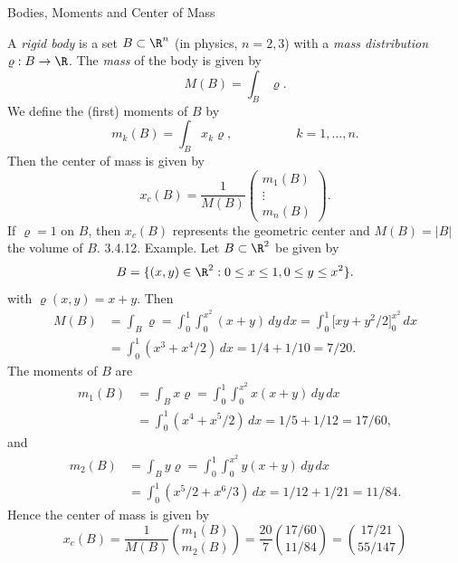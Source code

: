 \documentclass[smaller,hyperref={CJKbookmarks=true}]{beamer}
\begin{document}
\begin{frame}{Bodies, Moments and Center of Mass}
\begin{spacing}{0.75}
A \emph{rigid body} is a set $B\subset\R^n$ (in physics, $n=2,3$) with a \emph{mass distribution} $\varrho:B\to\R$. The \emph{mass} of the body is given by
\[M(B)=\int_B\varrho.\]
We define the (first) moments of $B$ by
\[m_k(B)=\int_B x_k\varrho,\qquad\qquad\quad
k=1,\ldots,n.\]
Then the center of mass is given by
\[x_c(B)=\frac{1}{M(B)}\begin{pmatrix}
                         m_1(B) \\
                         \vdots \\
                         m_n(B)
                       \end{pmatrix}.\]
If $\varrho=1$ on $B$, then $x_c(B)$ represents the geometric center and $M(B)=|B|$ the volume of $B$.
\newpage
\alert{3.4.12. Example.} Let $B\subset\R^2$ be given by
\[B=\{(x,y)\in\R^2:0\leq x\leq1,0\leq y\leq x^2\}.\]
with $\varrho(x,y)=x+y$. Then
\begin{equation*}
  \begin{split}
     M(B) &=\int_B\varrho=\int_{0}^{1}
     \int_{0}^{x^2}(x+y)\,dy\,dx=\int_{0}^{1}
     \big[xy+y^2/2\big]_0^{x^2}\,dx \\
       &=\int_{0}^{1}(x^3+x^4/2)\,dx=1/4+1/10=7/20.
  \end{split}
\end{equation*}
The moments of $B$ are
\begin{equation*}
  \begin{split}
     m_1(B) &=\int_Bx\varrho=\int_{0}^{1}\int_{0}^{x^2}x(x+y)\,dy\,dx \\
       &=\int_{0}^{1}(x^4+x^5/2)\,dx=1/5+1/12=17/60,
  \end{split}
\end{equation*}
\newpage
\vspace*{15pt}
and
\begin{equation*}
  \begin{split}
     m_2(B) &=\int_By\varrho=\int_{0}^{1}\int_{0}^{x^2}
     y(x+y)\,dy\,dx \\
       &=\int_{0}^{1}(x^5/2+x^6/3)\,dx=1/12+1/21=11/84.
  \end{split}
\end{equation*}
Hence the center of mass is given by
\[x_c(B)=\frac{1}{M(B)}\binom{m_1(B)}{m_2(B)}=
\frac{20}{7}\binom{17/60}{11/84}=\binom{17/21}{55/147}\]
\end{spacing}
\end{frame}
\end{document}
